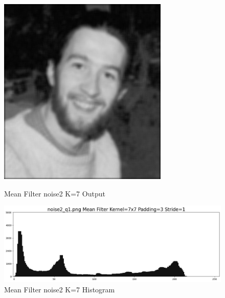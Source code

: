 \documentclass[12pt,a4paper]{report}
\begin{document}
\begin{figure}[!htb]
  \includegraphics[width=1\linewidth]{output/noise2_q1_K7P3.png}
  \caption{Mean Filter noise2 K=7 Output}
  \includegraphics[width=1\linewidth]{output/noise2_q1_K7P3_his.png}
  \caption{Mean Filter noise2 K=7 Histogram}
\end{figure}
\end{document}
